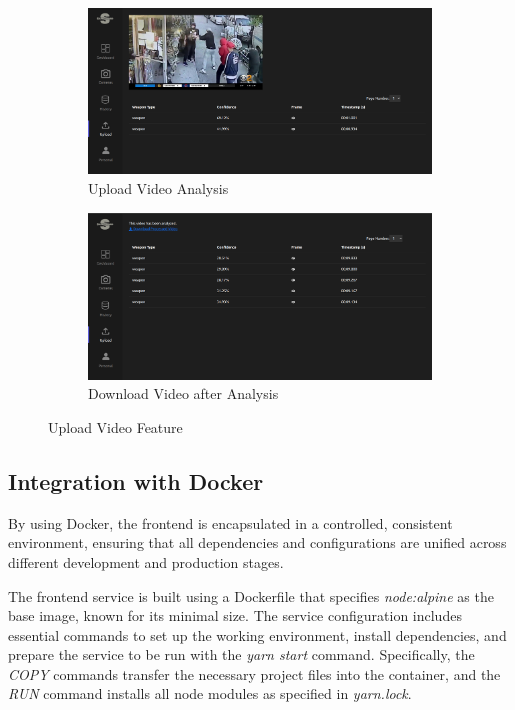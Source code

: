 \begin{figure}[h]
    \centering
    \begin{subfigure}[b]{0.49\textwidth}
        \centering
        \includegraphics[width=\linewidth]{figs/video-upload-analysis-page.png}
        \caption{Upload Video Analysis}
        \label{fig:upload-video-analysis}
    \end{subfigure}
    \hfill %
    \begin{subfigure}[b]{0.49\textwidth}
        \centering
        \includegraphics[width=\linewidth]{figs/download-video-page.png}
        \caption{Download Video after Analysis}
        \label{fig:download-video}
    \end{subfigure}
    \caption{Upload Video Feature}
    \label{fig:upload-video-section}
\end{figure}
\subsection{Integration with Docker}
By using Docker, the frontend is encapsulated in a controlled, consistent environment, ensuring that all 
dependencies and configurations are unified across different development and production stages.

The frontend service is built using a Dockerfile that specifies \textit{node:alpine} as the base image, known for its 
minimal size. The service configuration includes essential commands to set up the 
working environment, install dependencies, and prepare the service to be run with the \textit{yarn start} command. 
Specifically, the \textit{COPY} commands transfer the necessary project files into the container, and the \textit{RUN} 
command installs all node modules as specified in \textit{yarn.lock}.

